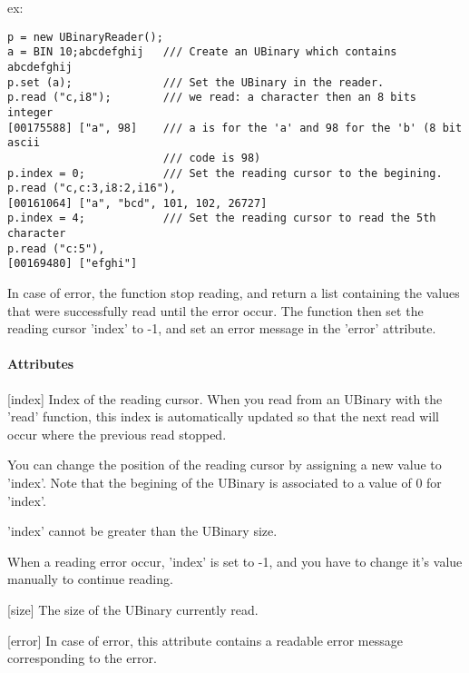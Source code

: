 \begin{description}
ex:


\begin{lstlisting}
p = new UBinaryReader();
a = BIN 10;abcdefghij   /// Create an UBinary which contains abcdefghij
p.set (a);              /// Set the UBinary in the reader.
p.read ("c,i8");        /// we read: a character then an 8 bits integer
[00175588] ["a", 98]    /// a is for the 'a' and 98 for the 'b' (8 bit ascii
                        /// code is 98)
p.index = 0;            /// Set the reading cursor to the begining.
p.read ("c,c:3,i8:2,i16"),
[00161064] ["a", "bcd", 101, 102, 26727]
p.index = 4;            /// Set the reading cursor to read the 5th character
p.read ("c:5"),
[00169480] ["efghi"]
\end{lstlisting}

          In case of error, the function stop reading, and return a
          list containing the values that were successfully read until
          the error occur. The function then set the reading cursor
          'index' to -{}1, and set an error message in the 'error'
          attribute.

\end{description}

\paragraph{Attributes}
\label{webots.uobjects.other.ubinaryreader.attributes}%

\noindent
\begin{description}
\item{}[{index}] Index of the reading cursor. When you read from an
  UBinary with the 'read' function, this index is automatically
  updated so that the next read will occur where the previous read
  stopped.


  You can change the position of the reading cursor by assigning a new
  value to 'index'. Note that the begining of the UBinary is
  associated to a value of 0 for 'index'.


  'index' cannot be greater than the UBinary size.


  When a reading error occur, 'index' is set to -{}1, and you have to
  change it's value manually to continue reading.

\item{}[{size}]           The size of the UBinary currently read.

\item{}[{error}]          In case of error, this attribute contains a readable error message
          corresponding to the error.

\end{description}

